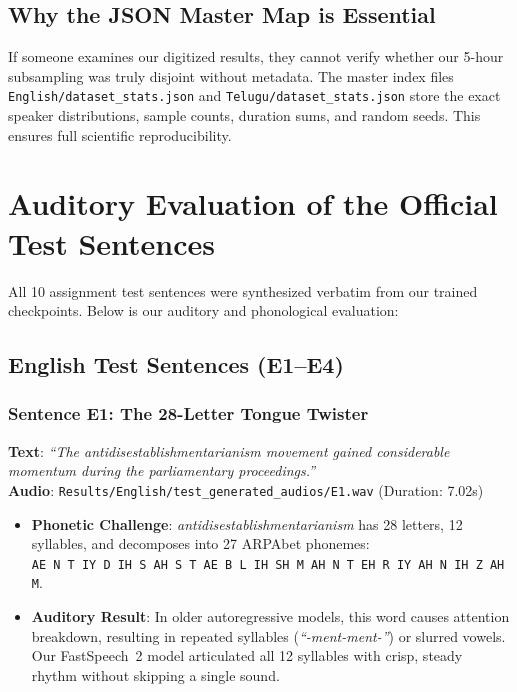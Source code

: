 \documentclass[11pt,a4paper]{article}
\begin{document}
\subsection{Why the JSON Master Map is Essential}
If someone examines our digitized results, they cannot verify whether our 5-hour subsampling was truly disjoint without metadata. 
The master index files \texttt{English/dataset\_stats.json} and \texttt{Telugu/dataset\_stats.json} store the exact speaker distributions, sample counts, duration sums, and random seeds. This ensures full scientific reproducibility.

\newpage

\section{Auditory Evaluation of the Official Test Sentences}

All 10 assignment test sentences were synthesized verbatim from our trained checkpoints. Below is our auditory and phonological evaluation:

\subsection{English Test Sentences (E1--E4)}

\subsubsection{Sentence E1: The 28-Letter Tongue Twister}
\textbf{Text}: \textit{``The antidisestablishmentarianism movement gained considerable momentum during the parliamentary proceedings.''} \\
\textbf{Audio}: \texttt{Results/English/test\_generated\_audios/E1.wav} (Duration: 7.02s)
\begin{itemize}
  \item \textbf{Phonetic Challenge}: \textit{antidisestablishmentarianism} has 28 letters, 12 syllables, and decomposes into 27 ARPAbet phonemes: \\
  \texttt{AE N T IY D IH S AH S T AE B L IH SH M AH N T EH R IY AH N IH Z AH M}.
  \item \textbf{Auditory Result}: In older autoregressive models, this word causes attention breakdown, resulting in repeated syllables (\textit{``-ment-ment-''}) or slurred vowels. Our FastSpeech~2 model articulated all 12 syllables with crisp, steady rhythm without skipping a single sound.
\end{itemize}
\end{document}
